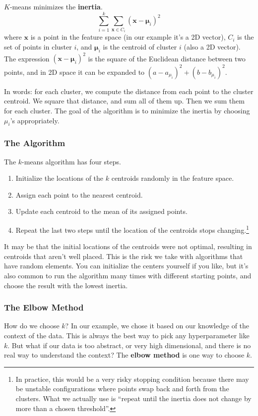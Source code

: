 $K$-means minimizes the \textbf{inertia}.
\begin{equation}
    \sum_{i=1}^{k} \sum_{\mathbf{x} \in C_i} (\mathbf{x} - \boldsymbol{\mu}_i)^2
\end{equation}
\noindent where $\mathbf{x}$ is a point in the feature space (in our example it's a 2D vector), $C_i$ is the set of points in cluster $i$, and $\boldsymbol{\mu}_i$ is the centroid of cluster $i$ (also a 2D vector). The expression $(\mathbf{x} - \boldsymbol{\mu}_i)^2$ is the square of the Euclidean distance between two points, and in 2D space it can be expanded to $(a-a_{\mu_i})^2 + (b-b_{\mu_i})^2$.

In words: for each cluster, we compute the distance from each point to the cluster centroid. We square that distance, and sum all of them up. Then we sum them for each cluster. The goal of the algorithm is to minimize the inertia by choosing $\mu_i$'s appropriately.

\subsubsection*{The Algorithm}
The $k$-means algorithm has four steps.

\begin{enumerate}
    \item Initialize the locations of the $k$ centroids randomly in the feature space.
    \item Assign each point to the nearest centroid.
    \item Update each centroid to the mean of its assigned points.
    \item Repeat the last two steps until the location of the centroids stops changing.\footnote{In practice, this would be a very risky stopping condition because there may be unstable configurations where points swap back and forth from the clusters. What we actually use is ``repeat until the inertia does not change by more than a chosen threshold''.}
\end{enumerate}

It may be that the initial locations of the centroids were not optimal, resulting in centroids that aren't well placed. This is the risk we take with algorithms that have random elements. You can initialize the centers yourself if you like, but it's also common to run the algorithm many times with different starting points, and choose the result with the lowest inertia.

\subsubsection*{The Elbow Method}
How do we choose $k$? In our example, we chose it based on our knowledge of the context of the data. This is always the best way to pick any hyperparameter like $k$. But what if our data is too abstract, or very high dimensional, and there is no real way to understand the context? The \textbf{elbow method} is one way to choose $k$. 

